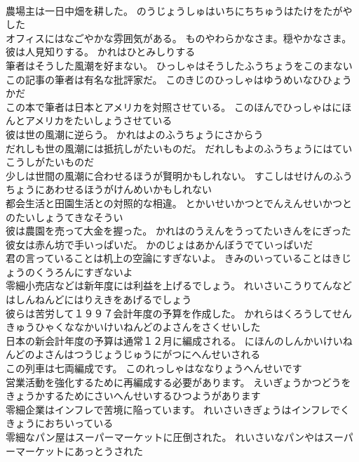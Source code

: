 \documentclass[8pt]{extreport}
\begin{document}
\begin{CJK}{UTF8}{min}
\\	農場主は一日中畑を耕した。	のうじょうしゅはいちにちちゅうはたけをたがやした 
\\	オフィスにはなごやかな雰囲気がある。	ものやわらかなさま。穏やかなさま。
\\	彼は人見知りする。	かれはひとみしりする 
\\	筆者はそうした風潮を好まない。	ひっしゃはそうしたふうちょうをこのまない 
\\	この記事の筆者は有名な批評家だ。	このきじのひっしゃはゆうめいなひひょうかだ 
\\	この本で筆者は日本とアメリカを対照させている。	このほんでひっしゃはにほんとアメリカをたいしょうさせている 
\\	彼は世の風潮に逆らう。	かれはよのふうちょうにさからう 
\\	だれしも世の風潮には抵抗しがたいものだ。	だれしもよのふうちょうにはていこうしがたいものだ 
\\	少しは世間の風潮に合わせるほうが賢明かもしれない。	すこしはせけんのふうちょうにあわせるほうがけんめいかもしれない 
\\	都会生活と田園生活との対照的な相違。	とかいせいかつとでんえんせいかつとのたいしょうてきなそうい 
\\	彼は農園を売って大金を握った。	かれはのうえんをうってたいきんをにぎった 
\\	彼女は赤ん坊で手いっぱいだ。	かのじょはあかんぼうでていっぱいだ 
\\	君の言っていることは机上の空論にすぎないよ。	きみのいっていることはきじょうのくうろんにすぎないよ 
\\	零細小売店などは新年度には利益を上げるでしょう。	れいさいこうりてんなどはしんねんどにはりえきをあげるでしょう 
\\	彼らは苦労して１９９７会計年度の予算を作成した。	かれらはくろうしてせんきゅうひゃくななかいけいねんどのよさんをさくせいした 
\\	日本の新会計年度の予算は通常１２月に編成される。	にほんのしんかいけいねんどのよさんはつうじょうじゅうにがつにへんせいされる 
\\	この列車は七両編成です。	このれっしゃはななりょうへんせいです 
\\	営業活動を強化するために再編成する必要があります。	えいぎょうかつどうをきょうかするためにさいへんせいするひつようがあります 
\\	零細企業はインフレで苦境に陥っています。	れいさいきぎょうはインフレでくきょうにおちいっている 
\\	零細なパン屋はスーパーマーケットに圧倒された。	れいさいなパンやはスーパーマーケットにあっとうされた 

\end{CJK}
\end{document}
